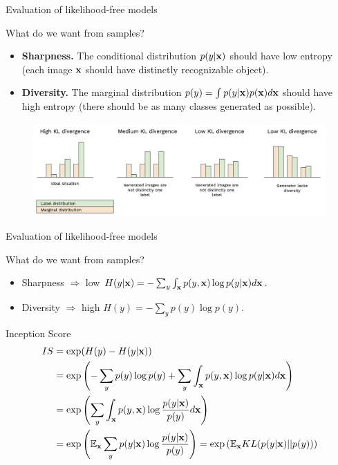 \begin{frame}{Evaluation of likelihood-free models}
	\begin{block}{What do we want from samples?}
		\begin{itemize}
			\item \textbf{Sharpness.}
			The conditional distribution $p(y | \mathbf{x})$ should have low entropy (each image $\mathbf{x}$ should have distinctly recognizable object).
			\item \textbf{Diversity.}
			The marginal distribution $p(y) = \int p(y | \mathbf{x}) p(\mathbf{x}) d \mathbf{x}$ should have high entropy (there should be as many classes generated as possible).
		\end{itemize}
	\end{block}
	\begin{figure}
		\centering
		\includegraphics[width=1.0\linewidth]{figs/is_toy}
	\end{figure}
\end{frame}
\begin{frame}{Evaluation of likelihood-free models}
		\begin{block}{What do we want from samples?}
		\begin{itemize}
			\item Sharpness $\Rightarrow$ low $H(y | \mathbf{x}) = - \sum_{y} \int_{\mathbf{x}} p(y, \mathbf{x}) \log p(y | \mathbf{x}) d\mathbf{x}$.
			\item Diversity $\Rightarrow$ high $H(y)  = - \sum_{y} p(y) \log p(y)$.
		\end{itemize}
	\end{block}
	\begin{block}{Inception Score}
		\vspace{-0.3cm}
		\footnotesize
		\begin{align*}
			IS &= \exp(H(y) - H(y | \mathbf{x})) \\ 
			&= \exp \left( - \sum_{y} p(y) \log p(y) + \sum_{y} \int_{\mathbf{x}} p(y, \mathbf{x}) \log p(y | \mathbf{x}) d\mathbf{x}\right) \\
			&= \exp \left( \sum_{y} \int_{\mathbf{x}} p(y, \mathbf{x}) \log \frac{p(y | \mathbf{x})}{p(y)} d\mathbf{x}\right) \\ 
			&= \exp \left( \mathbb{E}_{\mathbf{x}} \sum_{y} p(y | \mathbf{x}) \log \frac{p(y | \mathbf{x})}{p(y)} \right) = \exp \left( \mathbb{E}_{\mathbf{x}} KL(p(y | \mathbf{x}) || p(y)) \right)
		\end{align*}
	\end{block}
\end{frame}
